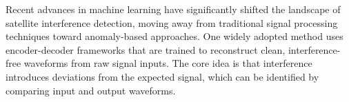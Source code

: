 \documentclass[conference]{IEEEtran}
\begin{document}




Recent advances in machine learning have significantly shifted the landscape of satellite interference detection, moving away from traditional signal processing techniques toward anomaly-based approaches. One widely adopted method uses encoder-decoder frameworks that are trained to reconstruct clean, interference-free waveforms from raw signal inputs. The core idea is that interference introduces deviations from the expected signal, which can be identified by comparing input and output waveforms.
\end{document}
